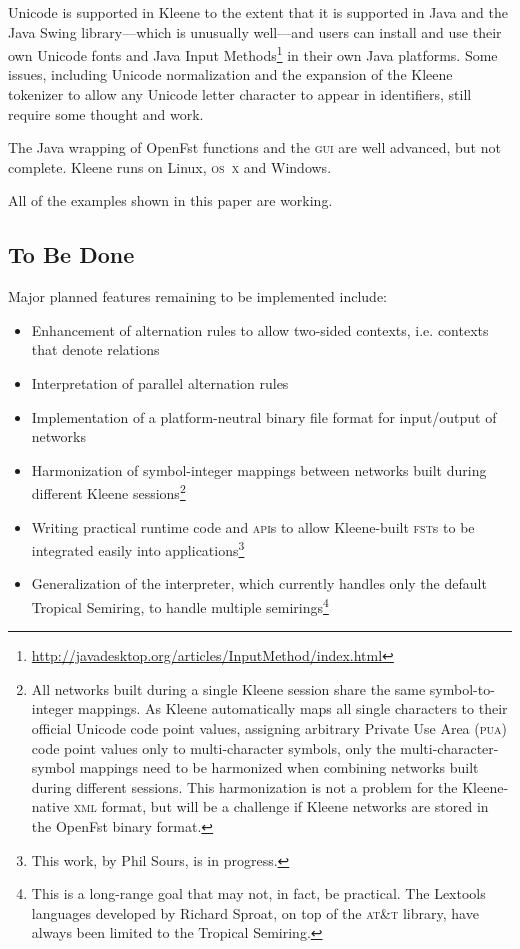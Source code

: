 \documentclass[letterpaper,12pt]{article}
\newcommand{\Kleene}{Kleene\xspace}
\newcommand{\acro}{\textsc}
\begin{document}
\noindent
Unicode is supported in \Kleene{} to the extent that it is supported in
Java and the Java Swing library---which is unusually well---and users can
install and use their own Unicode fonts and Java Input
Methods\footnote{\url{http://javadesktop.org/articles/InputMethod/index.html}}
in their own Java platforms.  Some issues, including Unicode
normalization and the expansion of the \Kleene{} tokenizer to allow any
Unicode letter character to appear in identifiers, still require some
thought and work.

The Java wrapping of OpenFst functions and the \acro{gui} are well
advanced, but not complete.  \Kleene{} runs on Linux, \acro{os~x}
and Windows.

All of the examples shown in this paper are working.

\subsection{To Be Done}

Major planned features remaining to be implemented include:

\begin{itemize}
\item
Enhancement of alternation rules to allow two-sided contexts, i.e.
contexts that denote relations
\item
Interpretation of parallel alternation rules
\item
Implementation of a platform-neutral binary file format for
input/output of networks
\item
Harmonization of symbol-integer mappings between networks built
during different \Kleene{} sessions\footnote{All
networks built during a single \Kleene{} session share the same symbol-to-integer mappings.  As
\Kleene{} automatically maps all single characters to their official Unicode code point values,
assigning arbitrary Private Use Area (\acro{pua}) code point values only to multi-character symbols, only the
multi-character-symbol mappings need to be harmonized when combining networks built
during different sessions.  This harmonization is not a problem for the Kleene-native \acro{xml}
format, but will be a challenge if Kleene networks are stored in the OpenFst binary format.}
\item
Writing practical runtime code and \acro{api}s to allow \Kleene{}-built \acro{fst}s to be integrated easily into
applications\footnote{This work, by Phil Sours, is in progress.}
\item
Generalization of the interpreter, which currently handles only the default
Tropical Semiring, to handle multiple semirings\footnote{This
is a long-range goal that may not, in fact, be practical.
The Lextools languages developed by Richard Sproat, on top of
the \acro{at\&t} library, have always been limited to the
Tropical Semiring.}
\end{itemize}
\end{document}
